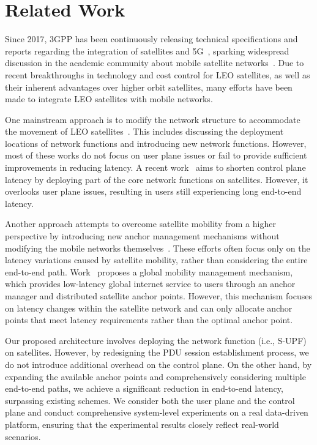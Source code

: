 \section{Related Work}
\vspace{-0.5ex}
Since 2017, 3GPP has been continuously releasing technical specifications and reports regarding the integration of satellites and 5G~\cite{38811,38821,23737,28841,36763,38863}, sparking widespread discussion in the academic community about mobile satellite networks~\cite{discussion1,discussion2,discussion3}. Due to recent breakthroughs in technology and cost control for LEO satellites, as well as their inherent advantages over higher orbit satellites, many efforts have been made to integrate LEO satellites with mobile networks.

One mainstream approach is to modify the network structure to accommodate the movement of LEO satellites~\cite{spaceMobileNet, UPFandGNB, CoreDesign, anotherApp, satelessCoreDesign}. This includes discussing the deployment locations of network functions and introducing new network functions. However, most of these works do not focus on user plane issues or fail to provide sufficient improvements in reducing latency.
A recent work~\cite{spaceMobileNet} aims to shorten control plane latency by deploying part of the core network functions on satellites. However, it overlooks user plane issues, resulting in users still experiencing long end-to-end latency. 

Another approach attempts to overcome satellite mobility from a higher perspective by introducing new anchor management mechanisms without modifying the mobile networks themselves~\cite{skycastle, MM2, MM3}. These efforts often focus only on the latency variations caused by satellite mobility, rather than considering the entire end-to-end path. Work~\cite{skycastle} proposes a global mobility management mechanism, which provides low-latency global internet service to users through an anchor manager and distributed satellite anchor points. However, this mechanism focuses on latency changes within the satellite network and can only allocate anchor points that meet latency requirements rather than the optimal anchor point.

Our proposed architecture involves deploying the network function (i.e., S-UPF) on satellites. However, by redesigning the PDU session establishment process, we do not introduce additional overhead on the control plane. On the other hand, by expanding the available anchor points and comprehensively considering multiple end-to-end paths, we achieve a significant reduction in end-to-end latency, surpassing existing schemes. We consider both the user plane and the control plane and conduct comprehensive system-level experiments on a real data-driven platform, ensuring that the experimental results closely reflect real-world scenarios.